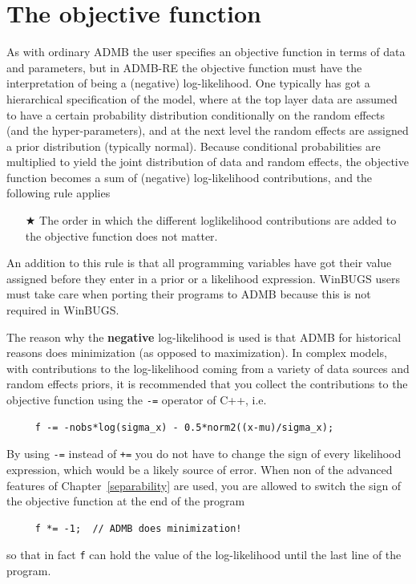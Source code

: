 \documentclass[12pt,letter,reqno]{book}
\begin{document}
\section{The objective function}
As with ordinary ADMB the user specifies an objective function in terms of data and parameters, but in ADMB-RE
the objective function must have the interpretation of being a (negative) log-likelihood. One typically has got
a hierarchical specification of the model, where at the top layer data are assumed to have a certain probability
distribution conditionally on the random effects (and the hyper-parameters), and at the next level the random
effects are assigned a prior distribution (typically normal). Because conditional probabilities are
multiplied to yield the joint distribution of data and random effects, the objective function becomes a sum of
(negative) log-likelihood contributions, and the following rule applies
\begin{itemize}
\item[$\bigstar$] 
The order in which the different loglikelihood contributions are added to the objective function does not matter.
\end{itemize}
An addition to this rule is that all programming variables have got their value assigned before
they enter in a prior or a likelihood expression. WinBUGS users must take care when porting their programs to 
ADMB because this is not required in WinBUGS.

The reason why the {\bf negative} log-likelihood is used is that ADMB 
for historical reasons does minimization (as opposed to maximization). In complex models, 
with contributions to the log-likelihood coming from a variety of data sources and random effects priors, 
it is recommended that you collect the contributions
to the objective function using the \texttt{-=} operator of C++, i.e.
\begin{lstlisting}
     f -= -nobs*log(sigma_x) - 0.5*norm2((x-mu)/sigma_x);
\end{lstlisting}
By using \texttt{-=} instead of \texttt{+=} you do not have to change the sign of every likelihood expression,
which would be a likely source of error. 
When non of the advanced features of Chapter~\ref{separability} are used, you are allowed to
switch the sign of the objective function at the end of the program
\begin{lstlisting}
     f *= -1;  // ADMB does minimization!
\end{lstlisting}
so that in fact \texttt{f} can hold the value of the log-likelihood until the last line of the program.
\end{document}
